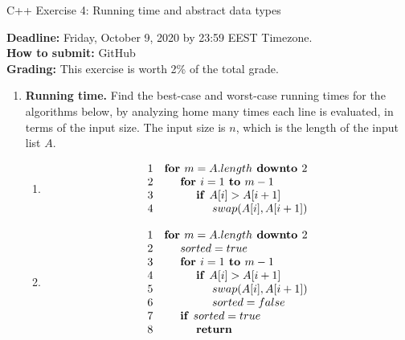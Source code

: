 \documentclass[a4paper,12pt]{article}
\begin{document}
\thispagestyle{empty}

\begin{center}
\Large C++ Exercise 4: Running time and abstract data types 
\end{center}

\noindent
\textbf{Deadline:} Friday, October 9, 2020 by 23:59 EEST Timezone.\\
\textbf{How to submit:} GitHub\\
\textbf{Grading:} This exercise is worth 2\% of the total grade.

\begin{enumerate}

\item \textbf{Running time.} Find the best-case and worst-case running times for the algorithms below, by analyzing home many times each line is evaluated, in terms of the input size. The input size is $n$, which is the length of the input list $A$.
\begin{enumerate}
\item {}
\[
\begin{array}{r l}
1 & \text{\textbf{for\ }}m = A.length \text{\textbf{\ downto\ }}2 \\
2 & \hspace{.5cm} \text{\textbf{for\ }} i = 1 \text{\textbf{\ to\ }} m-1 \\
3 & \hspace{1cm} \text{\textbf{if\ }} A[i] > A[i+1] \\
4 & \hspace{1.5cm} swap(A[i],A[i+1]) 
\end{array}
\]
\item {}
\[
\begin{array}{r l}
1 & \text{\textbf{for\ }}m = A.length \text{\textbf{\ downto\ }}2 \\
2 & \hspace{.5cm} sorted = true \\
3 & \hspace{.5cm} \text{\textbf{for\ }} i = 1 \text{\textbf{\ to\ }} m-1 \\
4 & \hspace{1cm} \text{\textbf{if\ }} A[i] > A[i+1] \\
5 & \hspace{1.5cm} swap(A[i],A[i+1]) \\
6 & \hspace{1.5cm} sorted = false \\
7 & \hspace{.5cm} \text{\textbf{if\ }}sorted = true \\
8 & \hspace{1cm} \text{\textbf{return}} 
\end{array}
\]
\end{enumerate}


\end{enumerate}
\end{document}
